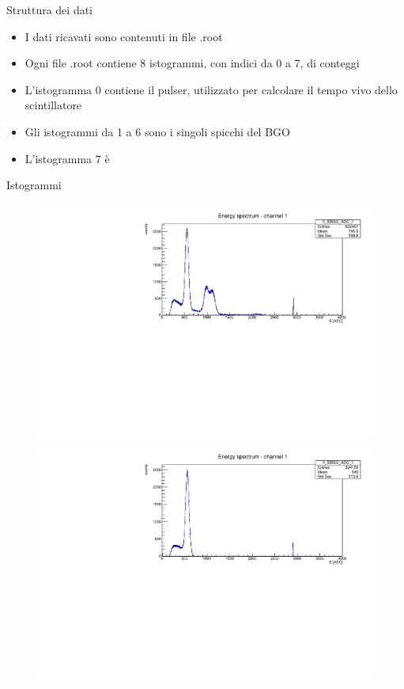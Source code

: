 \documentclass [xcolor=svgnames] {beamer}
\begin{document}
\begin{frame}{Struttura dei dati}
	\begin{itemize}
		\item I dati ricavati sono contenuti in file .root
		\item Ogni file .root contiene 8 istogrammi, con indici da 0 a 7, di conteggi
		\item L'istogramma 0 contiene il pulser, utilizzato per calcolare il tempo vivo dello scintillatore
		\item Gli istogrammi da 1 a 6 sono i singoli spicchi del BGO
		\item L'istogramma 7 è
	\end{itemize}
\end{frame}

\begin{frame}{Istogrammi}
	\begin{figure}
		\centering
		\begin{minipage}{0.45\textwidth}
			\centering
			\includegraphics[width=\linewidth]{img/ex1775.pdf} %
		\end{minipage}
		\hfill
		\begin{minipage}{0.45\textwidth}
			\centering
			\includegraphics[width=\linewidth]{img/ex1776.pdf} %
		\end{minipage}
		

\end{figure}
\end{frame}
\end{document}
